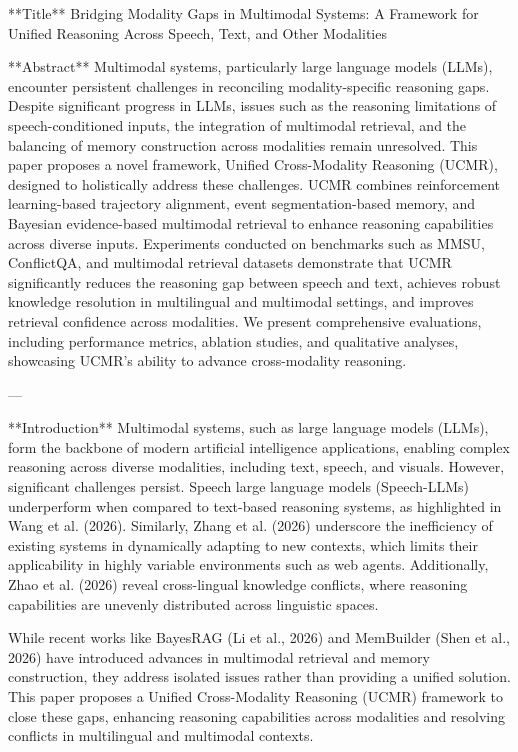 **Title**  
Bridging Modality Gaps in Multimodal Systems: A Framework for Unified Reasoning Across Speech, Text, and Other Modalities  

**Abstract**  
Multimodal systems, particularly large language models (LLMs), encounter persistent challenges in reconciling modality-specific reasoning gaps. Despite significant progress in LLMs, issues such as the reasoning limitations of speech-conditioned inputs, the integration of multimodal retrieval, and the balancing of memory construction across modalities remain unresolved. This paper proposes a novel framework, Unified Cross-Modality Reasoning (UCMR), designed to holistically address these challenges. UCMR combines reinforcement learning-based trajectory alignment, event segmentation-based memory, and Bayesian evidence-based multimodal retrieval to enhance reasoning capabilities across diverse inputs. Experiments conducted on benchmarks such as MMSU, ConflictQA, and multimodal retrieval datasets demonstrate that UCMR significantly reduces the reasoning gap between speech and text, achieves robust knowledge resolution in multilingual and multimodal settings, and improves retrieval confidence across modalities. We present comprehensive evaluations, including performance metrics, ablation studies, and qualitative analyses, showcasing UCMR's ability to advance cross-modality reasoning.

---

**Introduction**  
Multimodal systems, such as large language models (LLMs), form the backbone of modern artificial intelligence applications, enabling complex reasoning across diverse modalities, including text, speech, and visuals. However, significant challenges persist. Speech large language models (Speech-LLMs) underperform when compared to text-based reasoning systems, as highlighted in Wang et al. (2026). Similarly, Zhang et al. (2026) underscore the inefficiency of existing systems in dynamically adapting to new contexts, which limits their applicability in highly variable environments such as web agents. Additionally, Zhao et al. (2026) reveal cross-lingual knowledge conflicts, where reasoning capabilities are unevenly distributed across linguistic spaces.

While recent works like BayesRAG (Li et al., 2026) and MemBuilder (Shen et al., 2026) have introduced advances in multimodal retrieval and memory construction, they address isolated issues rather than providing a unified solution. This paper proposes a Unified Cross-Modality Reasoning (UCMR) framework to close these gaps, enhancing reasoning capabilities across modalities and resolving conflicts in multilingual and multimodal contexts.  

